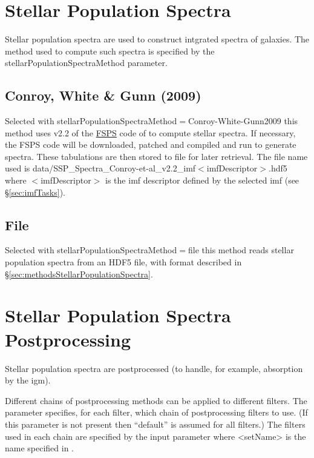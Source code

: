 \section{Stellar Population Spectra}

Stellar population spectra are used to construct intgrated spectra of galaxies. The method used to compute such spectra is specified by the {\normalfont \ttfamily stellarPopulationSpectraMethod} parameter.

\subsection{Conroy, White \& Gunn (2009)}

Selected with {\normalfont \ttfamily stellarPopulationSpectraMethod}$=${\normalfont \ttfamily Conroy-White-Gunn2009} this method uses v2.2 of the \href{http://www.cfa.harvard.edu/~cconroy/FSPS.html}{{\normalfont \ttfamily FSPS}} code of \cite{conroy_propagation_2009} to compute stellar spectra. If necessary, the {\normalfont \ttfamily FSPS} code will be downloaded, patched and compiled and run to generate spectra. These tabulations are then stored to file for later retrieval. The file name used is {\normalfont \ttfamily data/SSP\_Spectra\_Conroy-et-al\_v2.2\_imf$<$imfDescriptor$>$.hdf5} where $<${\normalfont \ttfamily imfDescriptor}$>$ is the \gls{imf} descriptor defined by the selected \gls{imf} (see \S\ref{sec:imfTasks}).

\subsection{File}

Selected with {\normalfont \ttfamily stellarPopulationSpectraMethod}$=${\normalfont \ttfamily file} this method reads stellar population spectra from an HDF5 file, with format described in \S\ref{sec:methodsStellarPopulationSpectra}.

\section{Stellar Population Spectra Postprocessing}\label{sec:StellarSpectraPostprocessing}

Stellar population spectra are postprocessed (to handle, for example, absorption by the \gls{igm}).

Different chains of postprocessing methods can be applied to different filters. The {\normalfont \ttfamily [luminosityPostprocessSet]} parameter specifies, for each filter, which chain of postprocessing filters to use. (If this parameter is not present then ``{\normalfont \ttfamily default}'' is assumed for all filters.) The filters used in each chain are specified by the input parameter {\normalfont {}} where {\normalfont \ttfamily \textless setName\textgreater} is the name specified in {\normalfont \ttfamily [luminosityPostprocessSet]}.

